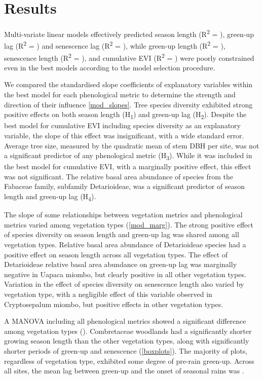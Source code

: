 \documentclass[11pt,a4paper]{article}
\begin{document}
\section{Results}

Multi-variate linear models effectively predicted season length (R\textsuperscript{2} = \lengthRsq{}), green-up lag (R\textsuperscript{2} = \glagRsq{}) and senescence lag (R\textsuperscript{2} = \slagRsq{}), while green-up length (R\textsuperscript{2} = \grateRsq{}), senescence length (R\textsuperscript{2} = \srateRsq{}), and cumulative EVI (R\textsuperscript{2} = \cumviRsq{}) were poorly constrained even in the best models according to the model selection procedure. 

We compared the standardised slope coefficients of explanatory variables within the best model for each phenological metric to determine the strength and direction of their influence \autoref{mod_slopes}. Tree species diversity exhibited strong positive effects on both season length (H\textsubscript{1}) and green-up lag (H\textsubscript{2}). Despite the best model for cumulative EVI including species diversity as an explanatory variable, the slope of this effect was insignificant, with a wide standard error. Average tree size, measured by the quadratic mean of stem DBH per site, was not a significant predictor of any phenological metric (H\textsubscript{3}). While it was included in the best model for cumulative EVI, with a marginally positive effect, this effect was not significant. The relative basal area abundance of species from the Fabaceae family, subfamily Detarioideae, was a significant predictor of season length and green-up lag (H\textsubscript{4}).

The slope of some relationships between vegetation metrics and phenological metrics varied among vegetation types (\autoref{mod_marg}). The strong positive effect of species diversity on season length and green-up lag was shared among all vegetation types. Relative basal area abundance of Detarioideae species had a positive effect on season length across all vegetation types. The effect of Detarioideae relative basal area abundance on green-up lag was marginally negative in Uapaca miombo, but clearly positive in all other vegetation types. Variation in the effect of species diversity on senescence length also varied by vegetation type, with a negligible effect of this variable observed in Cryptosepalum miombo, but positive effects in other vegetation types.
 
A MANOVA including all phenological metrics showed a significant difference among vegetation types (\phenManova{}). Combretaceae woodlands had a significantly shorter growing season length than the other vegetation types, along with significantly shorter periods of green-up and senescence (\autoref{boxplots}). The majority of plots, regardless of vegetation type, exhibited some degree of pre-rain green-up. Across all sites, the mean lag between green-up and the onset of seasonal rains was \greenLagMean{}.
\end{document}
